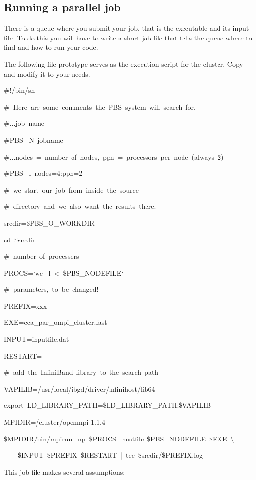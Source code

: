 \subsection{Running a parallel job}

There is a queue where you submit your job, that is the executable
and its input file. To do this you will have to write a short job
file that tells the queue where to find and how to run your code.

The following file prototype serves as the execution script for the
cluster. Copy and modify it to your needs.

\begin{lyxcode}
\#!/bin/sh

\#~Here~are~some~comments~the~PBS~system~will~search~for.

\#...job~name~

\#PBS~-N~jobname~

\#...nodes~=~number~of~nodes,~ppn~=~processors~per~node~(always~2)

\#PBS~-l~nodes=4:ppn=2



\#~we~start~our~job~from~inside~the~source

\#~directory~and~we~also~want~the~results~there.

srcdir=\$PBS\_O\_WORKDIR~

cd~\$srcdir



\#~number~of~processors

PROCS=`wc~-l~<~\$PBS\_NODEFILE`~



\#~parameters,~to~be~changed!

PREFIX=xxx~

EXE=cca\_par\_ompi\_cluster.fast

INPUT=inputfile.dat

RESTART=



\#~add~the~InfiniBand~library~to~the~search~path

VAPILIB=/usr/local/ibgd/driver/infinihost/lib64~

export~LD\_LIBRARY\_PATH=\$LD\_LIBRARY\_PATH:\$VAPILIB



MPIDIR=/cluster/openmpi-1.1.4



\$MPIDIR/bin/mpirun~-np~\$PROCS~-hostfile~\$PBS\_NODEFILE~\$EXE~\textbackslash

~~~~\$INPUT~\$PREFIX~\$RESTART~|~tee~\$srcdir/\$PREFIX.log


\end{lyxcode}
This job file makes several assumptions:

